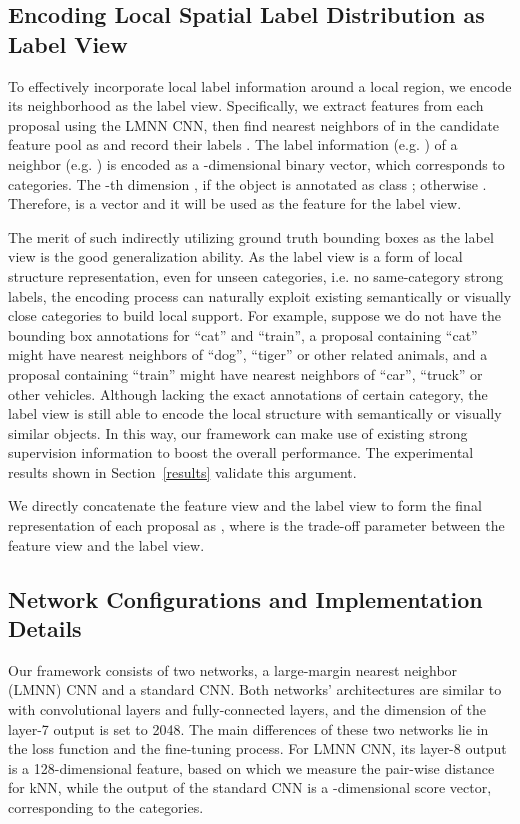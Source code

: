 \documentclass[10pt,twocolumn,letterpaper]{article}
\begin{document}
\subsection{Encoding Local Spatial Label Distribution as Label View} \label{encode}
To effectively incorporate local label information around a local
region, we encode its neighborhood as the label view.
Specifically, we extract features from each proposal
 using the LMNN CNN, then find  nearest neighbors
of  in the candidate feature pool as  and record their labels
. The label information (e.g. ) of a
neighbor (e.g. ) is encoded as a -dimensional binary
vector, which corresponds to  categories. The -th dimension
,  if the object is annotated as
class ; otherwise . Therefore, 
is a  vector and it will be used as the feature for
the label view.

The merit of such indirectly utilizing ground truth bounding boxes
as the label view is the good generalization ability. As the label
view is a form of local structure representation, even for unseen
categories, i.e. no same-category strong labels, the encoding
process can naturally exploit existing semantically or visually
close categories to build local support. For example, suppose we
do not have the bounding box annotations for ``cat'' and
``train'', a proposal containing ``cat'' might have nearest
neighbors of ``dog'', ``tiger'' or other related animals, and a
proposal containing ``train'' might have nearest neighbors of
``car'', ``truck'' or other vehicles. Although lacking the exact
annotations of certain category, the label view is still able to
encode the local structure with semantically or visually similar
objects. In this way, our framework can make use of existing
strong supervision information to boost the overall performance.
The experimental results shown in Section~\ref{results} validate
this argument.

We directly concatenate the feature view and the label view to
form the final representation of each proposal  as
, where
 is the trade-off parameter between the feature view and
the label view.

\subsection{Network Configurations and Implementation Details} \label{details}

Our framework consists of two networks, a large-margin nearest
neighbor (LMNN) CNN and a standard CNN. Both networks'
architectures are similar to~\cite{Chatfield2014} with 
convolutional layers and  fully-connected layers, and the
dimension of the layer-7 output is set to 2048. The main
differences of these two networks lie in the loss function and the
fine-tuning process. For LMNN CNN, its layer-8 output is a
128-dimensional feature, based on which we measure the pair-wise
distance for kNN, while the output of the standard CNN is a
-dimensional score vector, corresponding to the  categories.
\end{document}
